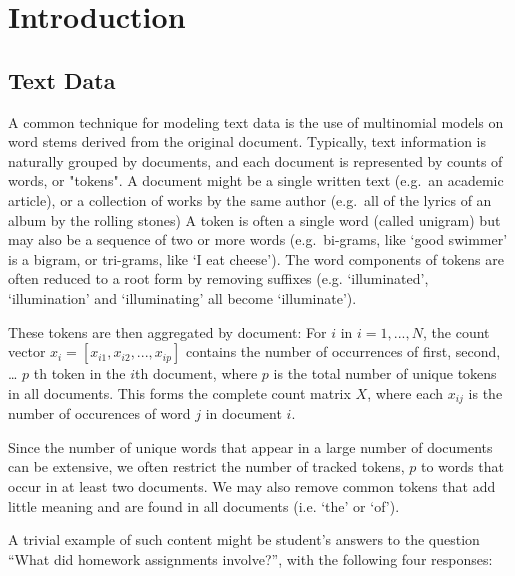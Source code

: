 \documentclass[12pt]{article}
\begin{document}
\vspace{1.5in}
\tableofcontents


\newpage


\section{Introduction}

\subsection{Text Data}




A common technique for modeling text data is the use of multinomial models on word stems derived from the original document.
Typically, text information is naturally grouped by documents, and each
document is represented by counts of words, or "tokens". A document might be a
single written text (e.g.~an academic article), or a collection of works
by the same author (e.g.~all of the lyrics of an album by the rolling
stones) A token is often a single word (called unigram) but may also be
a sequence of two or more words (e.g.~bi-grams, like `good swimmer' is a
bigram, or tri-grams, like `I eat cheese'). The word components of
tokens are often reduced to a root form by removing suffixes (e.g.
`illuminated', `illumination' and `illuminating' all become
`illuminate').

These tokens are then aggregated by document: For $i$ in $i = 1,...,N$,
the count vector $x_i = [x_{i1}, x_{i2}, ... , x_{ip}]$ contains the
number of occurrences of first, second, \ldots{} $p$ th token in the
$i$th document, where $p$ is the total number of unique tokens in all
documents. This forms the complete count matrix $X$, where each $x_{ij}$
is the number of occurences of word $j$ in document $i$.

Since the number of unique words that appear in a large number of
documents can be extensive, we often restrict the number of tracked
tokens, $p$ to words that occur in at least two documents. We may also
remove common tokens that add little meaning and are found in all
documents (i.e. `the' or `of').

A trivial example of such content might be student's answers to the
question ``What did homework assignments involve?'', with the following four responses:
\end{document}
